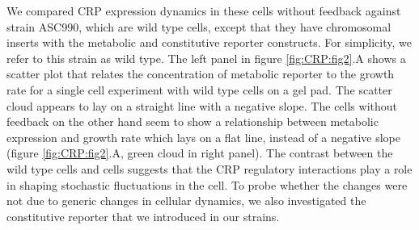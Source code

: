 We compared CRP expression dynamics in these cells without feedback against 
strain ASC990,
which are wild type \ecoli cells, except that they have chromosomal inserts with the metabolic and constitutive reporter constructs.
%
For simplicity, we refer to this strain as wild type.
%
%
%
%
The left panel in figure \ref{fig:CRP:fig2}.A shows a scatter plot that relates the concentration of metabolic reporter to the growth rate for a single cell experiment with wild type cells on a gel pad.
%
%
The scatter cloud appears to lay on a straight line with a negative slope.
%
The \dcamp cells without feedback on the other hand
seem to show a relationship between metabolic expression and growth rate which lays on a flat line, instead of a negative slope (figure \ref{fig:CRP:fig2}.A, green cloud in right panel).
%
%
The contrast between the wild type cells and \dcamp cells 
suggests that the CRP regulatory interactions play a role in shaping stochastic fluctuations in the cell. 
%
To probe whether 
the changes 
were not due to generic changes in cellular dynamics, 
we also investigated the constitutive reporter that we introduced in our strains. 
%
%
